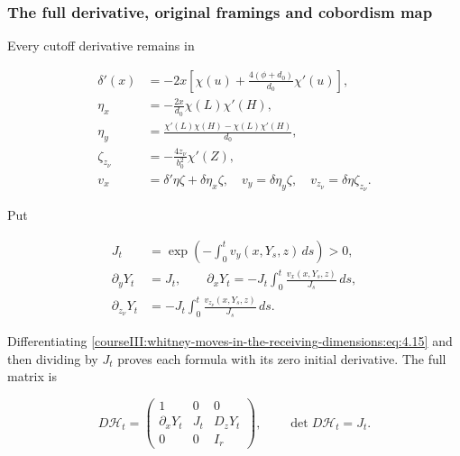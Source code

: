 \subsubsection{The full derivative, original framings and cobordism map}
\label{courseIII:whitney-moves-in-the-receiving-dimensions:section-4.3}

Every cutoff derivative remains in

\begin{equation}
\begin{aligned}
 \delta'(x)&=-2x\left[\chi(u)+
             \frac{4(\phi+d_0)}{d_0}\chi'(u)\right],\\
 \eta_x&=-\frac{2x}{d_0}\chi(L)\chi'(H),\\
 \eta_y&=\frac{\chi'(L)\chi(H)-\chi(L)\chi'(H)}{d_0},\\
 \zeta_{z_\nu}&=-\frac{4z_\nu}{b_0^2}\chi'(Z),\\
 v_x&=\delta'\eta\zeta+\delta\eta_x\zeta,\quad
 v_y=\delta\eta_y\zeta,\quad
 v_{z_\nu}=\delta\eta\zeta_{z_\nu}.
 \end{aligned}
 \label{courseIII:whitney-moves-in-the-receiving-dimensions:eq:4.21}
\end{equation}

Put

\begin{equation}
\begin{aligned}
 J_t&=\exp\left(-\int_0^t v_y(x,Y_s,z)\,ds\right)>0,\\
 \partial_yY_t&=J_t,\qquad
 \partial_xY_t=-J_t\int_0^t\frac{v_x(x,Y_s,z)}{J_s}\,ds,\\
 \partial_{z_\nu}Y_t&=-J_t\int_0^t
                   \frac{v_{z_\nu}(x,Y_s,z)}{J_s}\,ds .
 \end{aligned}
 \label{courseIII:whitney-moves-in-the-receiving-dimensions:eq:4.22}
\end{equation}

Differentiating \eqref{courseIII:whitney-moves-in-the-receiving-dimensions:eq:4.15} and then dividing by \(J_t\) proves each formula with its zero initial derivative. The full matrix is

\begin{equation}
D\mathcal H_t=
 \begin{pmatrix}
 1&0&0\\
 \partial_xY_t&J_t&D_zY_t\\
 0&0&I_r
 \end{pmatrix},\qquad
 \det D\mathcal H_t=J_t .
 \label{courseIII:whitney-moves-in-the-receiving-dimensions:eq:4.23}
\end{equation}

